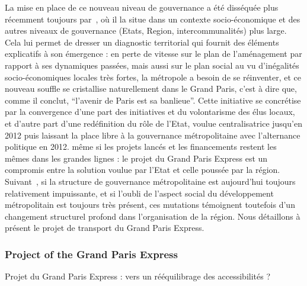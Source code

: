 La mise en place de ce nouveau niveau de gouvernance a été disséquée plus récemment toujours par~\cite{gilli2014gouverner}, où il la situe dans un contexte socio-économique et des autres niveaux de gouvernance (Etats, Region, intercommunalités) plus large. Cela lui permet de dresser un diagnostic territorial qui fournit des éléments explicatifs à son émergence : en perte de vitesse sur le plan de l'aménagement par rapport à ses dynamiques passées, mais aussi sur le plan social au vu d'inégalités socio-économiques locales très fortes, la métropole a besoin de se réinventer, et ce nouveau souffle se cristallise naturellement dans le Grand Paris, c'est à dire que, comme il conclut, ``l'avenir de Paris est sa banlieue''. Cette initiative se concrétise par la convergence d'une part des initiatives et du volontarisme des élus locaux, et d'autre part d'une redéfinition du rôle de l'Etat, voulue centralisatrice jusqu'en 2012 puis laissant la place libre à la gouvernance métropolitaine avec l'alternance politique en 2012. même si les projets lancés et les financements restent les mêmes dans les grandes lignes : le projet du Grand Paris Express est un compromis entre la solution voulue par l'Etat et celle poussée par la région. Suivant~\cite{desjardins2016grand}, si la structure de gouvernance métropolitaine est aujourd'hui toujours relativement impuissante, et si l'oubli de l'aspect social du développement métropolitain est toujours très présent, ces mutations témoignent toutefois d'un changement structurel profond dans l'organisation de la région. Nous détaillons à présent le projet de transport du Grand Paris Express.







\subsubsection{Project of the Grand Paris Express}{Projet du Grand Paris Express : vers un rééquilibrage des accessibilités ?}






